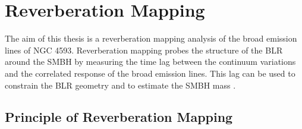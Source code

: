 \section{Reverberation Mapping}
\label{sec:reverberation_mapping}

The aim of this thesis is a reverberation mapping analysis of the broad emission lines of NGC 4593. Reverberation mapping probes the structure of the BLR around the SMBH by measuring the time lag between the continuum variations and the correlated response of the broad emission lines. This lag can be used to constrain the BLR geometry and to estimate the SMBH mass \parencite{peterson1993}.  


\subsection{Principle of Reverberation Mapping}
\label{subsec:rm_principle}

